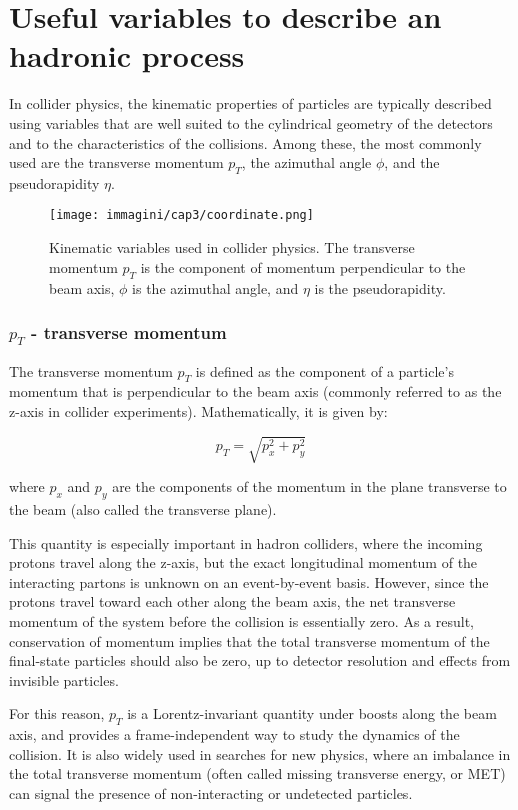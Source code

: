\section{Useful variables to describe an hadronic process}
In collider physics, the kinematic properties of particles are typically described using variables that are well suited to the cylindrical geometry of the detectors and to the characteristics of the collisions. Among these, the most commonly used are the transverse momentum $p_T$, the azimuthal angle $\phi$, and the pseudorapidity $\eta$.


\begin{figure}[!htbp]
    \centering
    \texttt{[image: immagini/cap3/coordinate.png]}
    \caption{Kinematic variables used in collider physics. The transverse momentum $p_T$ is the component of momentum perpendicular to the beam axis, $\phi$ is the azimuthal angle, and $\eta$ is the pseudorapidity.}
    \label{fig:kinematic_variables}
\end{figure}

\subsubsection{$p_T$ - transverse momentum}

The transverse momentum $p_T$ is defined as the component of a particle’s momentum that is perpendicular to the beam axis (commonly referred to as the z-axis in collider experiments).
Mathematically, it is given by:

\begin{equation}
    p_T = \sqrt{p_x^2 + p_y^2}
\end{equation}

where $p_x$ and $p_y$ are the components of the momentum in the plane transverse to the beam (also called the transverse plane).

This quantity is especially important in hadron colliders, where the incoming protons travel along the z-axis, but the exact longitudinal momentum of the interacting partons is unknown on an event-by-event basis.
However, since the protons travel toward each other along the beam axis, the net transverse momentum of the system before the collision is essentially zero. As a result, conservation of momentum implies that the total transverse momentum of the final-state particles should also be zero, up to detector resolution and effects from invisible particles.

For this reason, $p_T$ is a Lorentz-invariant quantity under boosts along the beam axis, and provides a frame-independent way to study the dynamics of the collision. It is also widely used in searches for new physics, where an imbalance in the total transverse momentum (often called missing transverse energy, or MET) can signal the presence of non-interacting or undetected particles.

